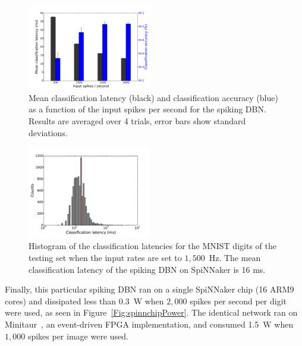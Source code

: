 \begin{figure}[hbt!]
	\centering
	\includegraphics[width=0.48\textwidth]{images/evan/latencyCAfiringrate.pdf}
	\caption{Mean classification latency (black) and classification accuracy (blue) as a function of the input spikes per second for the spiking DBN. Results are averaged over 4 trials, error bars show standard deviations.}
	\label{Fig:brianLatency}
\end{figure} 



\begin{figure}[hbt!]
	\centering
	\includegraphics[width=0.48\textwidth]{images/evan/classlatencyIJCNN1500hz.pdf}
	\caption{Histogram of the classification latencies for the MNIST digits of the testing set when the input rates are set to $1,500$~Hz. The mean classification latency of the spiking DBN on SpiNNaker is 16 ms.}
	\label{Fig:spinnLatency1500hz}
\end{figure} 


Finally, this particular spiking DBN ran on a single SpiNNaker chip (16 ARM9 cores) and dissipated less than 0.3~W when $2,000$ spikes per second per digit were used, as seen in Figure~\ref{Fig:spinnchipPower}. The identical network ran on Minitaur~\citep{neil2014minitaur}, an event-driven FPGA implementation, and consumed 1.5~W when $1,000$ spikes per image were used.  


